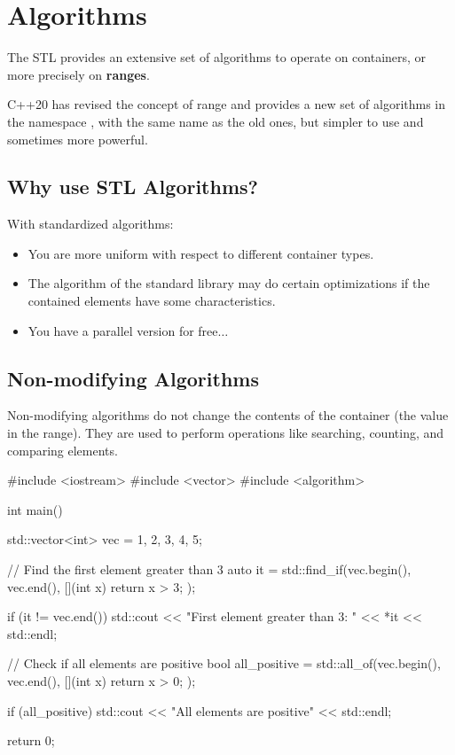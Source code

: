 \section{Algorithms}

The STL provides an extensive set of algorithms to operate on containers, or more precisely on
\textbf{ranges}.

\begin{warningblock}
    C++20 has revised the concept of range and provides a new set of algorithms in the
    namespace  , with the same name as the old ones, but simpler to use
    and sometimes more powerful.
\end{warningblock}

\subsection*{Why use STL Algorithms?}

With standardized algorithms:
\begin{itemize}
    \item You are more uniform with respect to different container types.
    \item The algorithm of the standard library may do certain optimizations if the contained elements have some characteristics.
    \item You have a parallel version for free$\dots$
\end{itemize}

\subsection{Non-modifying Algorithms}

Non-modifying algorithms do not change the contents of the container (the value in the range). They are used to perform operations like searching, counting, and comparing elements.

\begin{exampleblock}
\begin{codeblock}[language=C++]
#include <iostream>
#include <vector>
#include <algorithm>

int main() {
    std::vector<int> vec = {1, 2, 3, 4, 5};

    // Find the first element greater than 3
    auto it = std::find_if(vec.begin(), vec.end(), [](int x) { return x > 3; });

    if (it != vec.end()) {
        std::cout << "First element greater than 3: " << *it << std::endl;
    }

    // Check if all elements are positive
    bool all_positive = std::all_of(vec.begin(), vec.end(), [](int x) { return x > 0; });

    if (all_positive) {
        std::cout << "All elements are positive" << std::endl;
    }

    return 0;
}
\end{codeblock}
\end{exampleblock}

